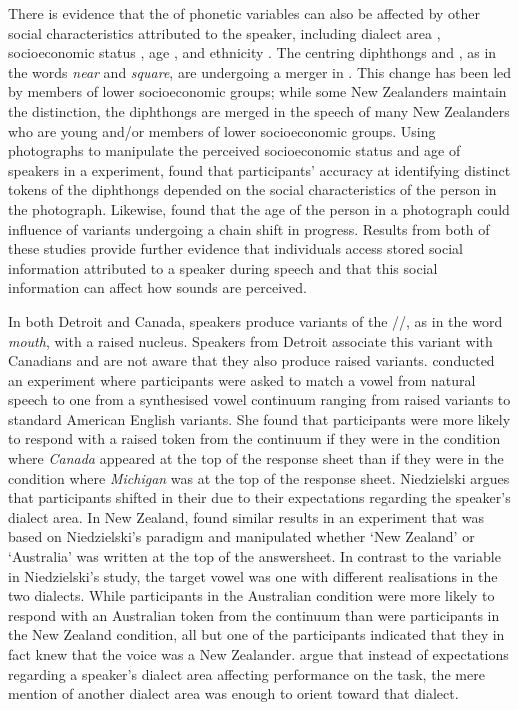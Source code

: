 There is evidence that the  of phonetic variables can also be affected by other social characteristics at\-tri\-but\-ed to the spea\-ker, including dialect area \citep{niedzielski1999,haynolandrager2006}, socioeconomic status \citep{haywarrendrager2006}, age \citep{haywarrendrager2006,drager2006,dragerunderrev}, and ethnicity \citep{staumcasasanto2010}. The centring diphthongs  and , as in the words \textit{near} and \textit{square}, are undergoing a merger in . This change has been led by members of lower socioeconomic groups; while some New Zealanders maintain the distinction, the diphthongs are merged in the speech of many New Zealanders who are young and/or members of lower socioeconomic groups. Using photographs to manipulate the perceived socioeconomic status and age of speakers in a  experiment, \citet{haywarrendrager2006} found that participants' accuracy at identifying distinct tokens of the diphthongs depended on the social characteristics of the person in the photograph. Likewise, \citet{dragerunderrev} found that the age of the person in a photograph could influence  of variants undergoing a chain shift in progress. Results from both of these studies provide further evidence that individuals access stored social information attributed to a speaker during speech  and that this social information can affect how sounds are perceived.

In both Detroit and Canada, speakers produce variants of the  //, as in the word \textit{mouth}, with a raised nucleus. Speakers from Detroit associate this variant with Canadians and are not aware that they also produce raised variants. \citet{niedzielski1999} conducted an experiment where participants were asked to match a vowel from natural speech to one from a synthesised vowel continuum ranging from raised variants to standard American English variants. She found that participants were more likely to respond with a raised token from the continuum if they were in the condition where \textit{Canada} appeared at the top of the response sheet than if they were in the condition where \textit{Michigan} was at the top of the response sheet. Niedzielski argues that participants shifted in their  due to their expectations regarding the speaker's dialect area. In New Zealand, \citet{haynolandrager2006} found similar results in an experiment that was based on Niedzielski's paradigm and manipulated whether `New Zealand' or `Australia' was written at the top of the answersheet. In contrast to the variable in Niedzielski's study, the target vowel  was one with different realisations in the two dialects. While participants in the Australian condition were more likely to respond with an Australian token from the continuum than were participants in the New Zealand condition, all but one of the participants indicated that they in fact knew that the voice was a New Zealander. \citet{haynolandrager2006} argue that instead of expectations regarding a speaker's dialect area affecting performance on the task, the mere mention of another dialect area was enough to orient  toward that dialect. 

